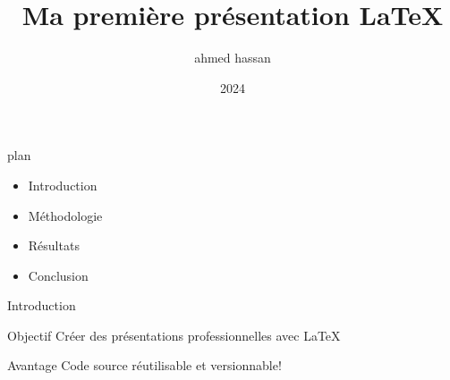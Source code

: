 \documentclass{beamer}
\title{Ma première présentation LaTeX}
\author{ahmed hassan}
\date{2024}
\begin{document}
	\begin{frame}
		\titlepage
	\end{frame}
	
	\begin{frame}{plan}
		\begin{itemize}
			\item Introduction
			\item Méthodologie
			\item Résultats
			\item Conclusion
		\end{itemize}
	\end{frame}
		
		
	\begin{frame}{Introduction}
		\begin{block}{Objectif}
			Créer des présentations professionnelles avec LaTeX
		\end{block}
		
		\begin{alertblock}{Avantage}
			Code source réutilisable et versionnable!
		\end{alertblock}
	\end{frame}
\end{document}
